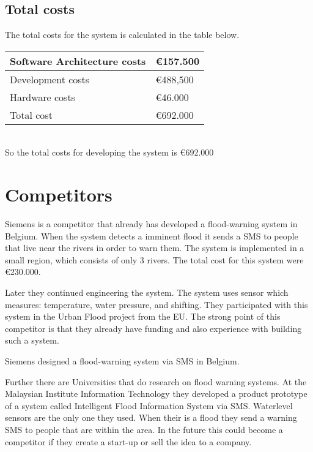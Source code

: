 \subsection{Total costs}
The total costs for the system is calculated in the table below.\\
\newline
\begin{tabular}{|L{}|L{}|}
	\toprule
	Software Architecture costs & \euro{}157.500\\ \midrule
	Development costs & \euro{}{}488,500\\ \midrule
	Hardware costs & \euro{}46.000\\ \midrule
	Total cost & \euro{}692.000\\
	\bottomrule
\end{tabular}\\
\newline
So the total costs for developing the system is \euro{}692.000\\

\section{Competitors}
Siemens is a competitor that already has developed a flood-warning system in Belgium. When the system detects a imminent flood it sends a SMS to people that live near the rivers in order to warn them. The system is implemented in a small region, which consists of only 3 rivers. The total cost for this system were \euro{}230.000.

Later they continued engineering the system. The system uses sensor which measures: temperature, water pressure, and shifting. They participated with this system in the Urban Flood project from the EU. The strong point of this competitor is that they already have funding and also experience with building such a system.

Siemens designed a flood-warning system via SMS in Belgium.

Further there are Universities that do research on flood warning systems. At the Malaysian Institute Information Technology they developed a product prototype of a system called Intelligent Flood Information System via SMS. Waterlevel sensors are the only one they used. When their is a flood they send a warning SMS to people that are within the area. In the future this could become a competitor if they create a start-up or sell the idea to a company.  

